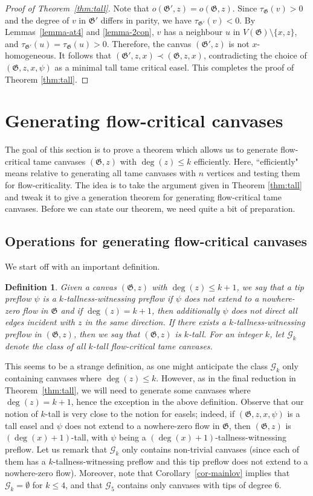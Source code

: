 \documentclass{article}
\newcommand{\GG}{\mathcal{G}}
\newcommand\g{\mathfrak{G}}
\newtheorem{definition}[theorem]{Definition}
\begin{document}
\begin{proof}[Proof of Theorem~\ref{thm:tall}]
Note that $o(\g',z)=o(\g,z)$.  Since $\tau_{\g}(v)>0$ and the degree of $v$ in $\g'$ differs in parity, we have $\tau_{\g'}(v)<0$.
By Lemmas~\ref{lemma-at4} and \ref{lemma-2con}, $v$ has a neighbour $u$ in $V(\g)\setminus \{x,z\}$, and $\tau_{\g'}(u)=\tau_{\g}(u)>0$.
Therefore, the canvas $(\g',z)$ is not $x$-homogeneous.  It follows that $(\g',z,x)\prec (\g,z,x)$, contradicting the choice of $(\g,z,x,\psi)$
as a minimal tall tame critical easel. This completes the proof of Theorem \ref{thm:tall}.
\end{proof}
\section{Generating flow-critical canvases}\label{sec:canvasgeneration}

The goal of this section is to prove a theorem which allows us to generate flow-critical tame canvases $(\g,z)$ with $\deg(z) \leq k$ efficiently. Here, ``efficiently" means relative to generating all tame canvases with $n$ vertices and testing them for flow-criticality. The idea is to take the argument given in Theorem \ref{thm:tall} and tweak it to give a generation theorem for  generating flow-critical tame canvases. Before we can state our theorem, we need quite a bit of preparation.


\subsection{Operations for generating flow-critical canvases}\label{subsec:canvasops}

We start off with an important definition.

\begin{definition}
Given a canvas $(\g,z)$ with $\deg(z)\le k+1$, we say that a tip preflow $\psi$
is a \emph{$k$-tallness-witnessing preflow} if $\psi$ does not extend to a
nowhere-zero flow in $\g$ and if $\deg(z)=k+1$, then additionally $\psi$ does
not direct all edges incident with $z$ in the same direction. If there exists a
$k$-tallness-witnessing preflow in $(\g,z)$, then we say that $(\g,z)$ is
\emph{$k$-tall}. For an integer $k$, let $\GG_k$ denote the class of all
$k$-tall flow-critical tame canvases.
\end{definition}

This seems to be a strange definition, as one might anticipate the class $\GG_k$ only containing canvases where $\deg(z)\le k$. 
However, as in the final reduction in Theorem~\ref{thm:tall}, we will need to
generate some canvases where $\deg(z) = k+1$, hence the exception in the above
definition. Observe that our notion of $k$-tall is very close to the notion for
easels; indeed, if $(\g,z,x,\psi)$ is a tall easel and $\psi$ does not extend
to a nowhere-zero flow in $\g$, then $(\g,z)$ is $(\deg(x)+1)$-tall, with
$\psi$ being a $(\deg(x)+1)$-tallness-witnessing preflow. Let us remark that
$\GG_k$ only contains non-trivial canvases (since each of them has a
$k$-tallness-witnessing preflow and this tip preflow does not extend to a
nowhere-zero flow).  Moreover, note that Corollary~\ref{cor-mainlov} implies
that $\GG_k=\emptyset$ for $k\le 4$, and that $\GG_5$ contains only canvases with tips of degree $6$.
\end{document}
